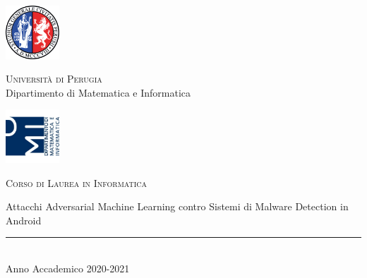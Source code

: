 \thispagestyle{empty} %

	\noindent %
	\includegraphics[width=0.15\textwidth]{imgs/unipg.png}
	\begin{minipage}[b]{0.7\textwidth}
		\centering
		{\Large \textsc{Universit{\`a} di Perugia}}\\
		\vspace{0.4 em}
		{\large Dipartimento di Matematica e Informatica}
		\vspace{0.6 em}
	\end{minipage}%
	\includegraphics[width=0.15\textwidth]{imgs/dmi.png}
	
	\vspace{5 em}

	\begin{center}
		
		{\large \textsc{Corso di Laurea in Informatica}}
		\vspace{8 em}
		
		{\Huge Attacchi Adversarial Machine Learning contro Sistemi di Malware Detection in Android \par} %
		\vspace{10 em}
		
	
		\vspace{6 em}
		\vfill
		
		\rule{380pt}{.4pt}\\
		\vspace{0.4 em}
		\large{Anno Accademico 2020-2021}
		
	\end{center}
